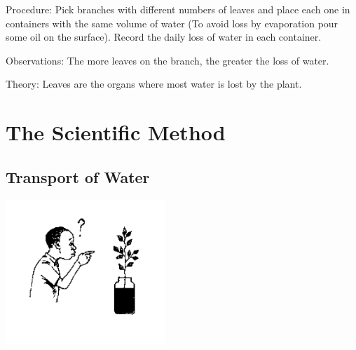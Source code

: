 \begin{multicols}{2}
\begin{description*}
\item[Procedure:]{Pick branches with different numbers of leaves and place each one in containers with the
same volume of water (To avoid loss by evaporation pour some oil on the surface). Record
the daily loss of water in each container.}
\item[Observations:]{The more leaves on the branch, the greater the loss of water.}
\item[Theory:]{Leaves are the organs where most water is lost by the plant.}
\end{description*}


\section*{The Scientific Method} 


\subsection{Transport of Water}  %

\begin{center}
\includegraphics[width=0.45\textwidth]{./img/source/sci-meth-ink-plant.png}
\end{center}


\end{multicols}
